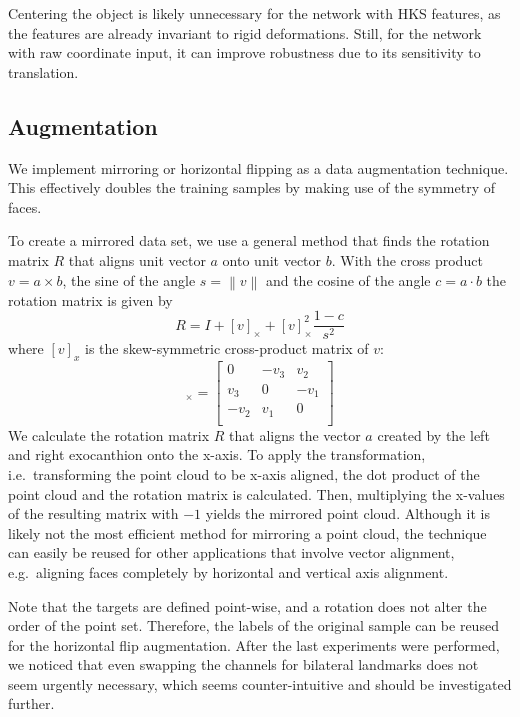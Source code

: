 \documentclass[class=article, crop=false]{standalone}
\newcommand{\norm}[1]{\left\lVert#1\right\rVert}
\begin{document}
Centering the object is likely unnecessary for the network with HKS features, as the features are already invariant to rigid deformations. Still, for the network with raw coordinate input, it can improve robustness due to its sensitivity to translation.

\subsection{Augmentation}
We implement mirroring or horizontal flipping as a data augmentation technique. This effectively doubles the training samples by making use of the symmetry of faces.

To create a mirrored data set, we use a general method that finds the rotation matrix $R$ that aligns unit vector $a$ onto unit vector $b$. With the cross product $v = a \times b$, the sine of the angle $s = \norm{v}$ and the cosine of the angle $c = a \cdot b$ the rotation matrix is given by 
\begin{equation}
    R = I + [v]_\times + [v]^2_\times \frac{1-c}{s^2}
\end{equation} where $[v]_x$ is the skew-symmetric cross-product matrix of $v$:
\begin{equation}
    [v]_\times = \begin{bmatrix}
0 & -v_3 & v_2 \\
v_3 & 0 & -v_1 \\
-v_2 & v_1 & 0 \\
\end{bmatrix}
\end{equation}
We calculate the rotation matrix $R$ that aligns the vector $a$ created by the left and right exocanthion onto the x-axis. To apply the transformation, i.e.\ transforming the point cloud to be x-axis aligned, the dot product of the point cloud and the rotation matrix is calculated. Then, multiplying the x-values of the resulting matrix with $-1$ yields the mirrored point cloud. Although it is likely not the most efficient method for mirroring a point cloud, the technique can easily be reused for other applications that involve vector alignment, e.g.\ aligning faces completely by horizontal and vertical axis alignment.

Note that the targets are defined point-wise, and a rotation does not alter the order of the point set. Therefore, the labels of the original sample can be reused for the horizontal flip augmentation. After the last experiments were performed, we noticed that even swapping the channels for bilateral landmarks does not seem urgently necessary, which seems counter-intuitive and should be investigated further.
\end{document}
